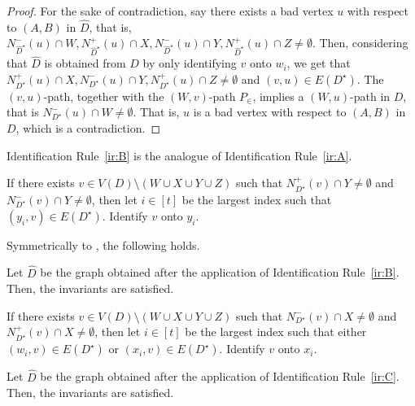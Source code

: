 \begin{proof}
 For the sake of contradiction, say there exists a bad vertex $u$ with respect to $(A,B)$ in $\widehat{D}$, that is, $N_{\widehat{D}^{\star}}^-(u) \cap W, N_{\widehat{D}^{\star}}^+(u) \cap X, N_{\widehat{D}^{\star}}^-(u) \cap Y, N_{\widehat{D}^{\star}}^+(u) \cap Z \neq \emptyset$. 
Then, considering that $\widehat{D}$ is obtained from $D$ by only identifying $v$ onto $w_i$, we get that
$N_{D^{\star}}^+(u) \cap X, N_{D^{\star}}^-(u) \cap Y, N_{D^{\star}}^+(u) \cap Z \neq \emptyset$ and $(v,u) \in E(D^{\star})$.  The $(v,u)$-path, together with the $(W,v)$-path $P_{\in}$, implies a $(W,u)$-path in $D$, that is $N_{D^{\star}}^-(u) \cap W \neq \emptyset$. That is, $u$ is a bad vertex with respect to $(A,B)$ in $D$, which is a contradiction.
\end{proof}

Identification Rule~\ref{ir:B} is the analogue of Identification Rule~\ref{ir:A}.

\begin{identification rule}\label{ir:B}
If there exists $v \in V(D) \setminus (W \cup X \cup Y \cup Z)$ such that $N_{D^{\star}}^+(v) \cap Y \neq \emptyset$ and $N_{D^{\star}}^-(v) \cap Y \neq \emptyset$, then let $i \in [t]$ be the largest index such that $(y_i,v) \in E(D^{\star})$. Identify $v$ onto $y_i$.
\end{identification rule}

Symmetrically to , the following holds.

\begin{lemma}\label{lem:irB-safe}
Let $\widehat{D}$ be the graph obtained after the application of Identification Rule~\ref{ir:B}. Then, the invariants are satisfied.
\end{lemma}

\begin{identification rule}\label{ir:C}
If there exists $v \in V(D) \setminus (W \cup X \cup Y \cup Z)$ such that $N_{D^{\star}}^-(v) \cap X \neq \emptyset$ and  $N_{D^{\star}}^+(v) \cap X \neq \emptyset$,
then let $i \in [t]$ be the largest index such that either $(w_i,v) \in E(D^{\star})$ or $(x_i,v) \in E(D^{\star})$. 
Identify $v$ onto $x_i$.
\end{identification rule}

\begin{lemma}\label{lem:irC-safe}
Let $\widehat{D}$ be the graph obtained after the application of Identification Rule~\ref{ir:C}. Then, the invariants are satisfied.
\end{lemma}

